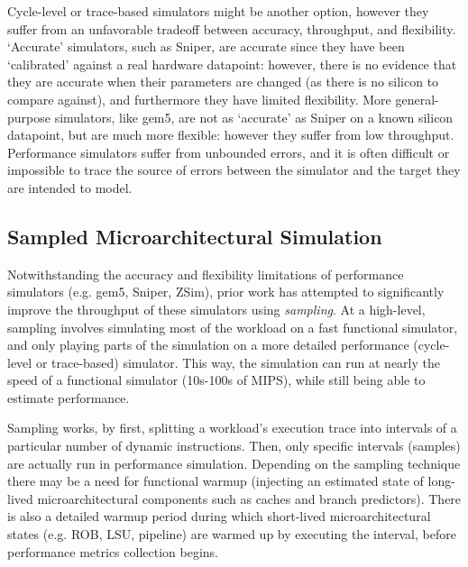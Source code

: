 \documentclass[sigplan,nonacm,10pt]{acmart}
\begin{document}
Cycle-level or trace-based simulators might be another option, however they suffer from an unfavorable tradeoff between accuracy, throughput, and flexibility\cite{arch_sim_considered_harmful, the_whole_truth}.
`Accurate' simulators, such as Sniper, are accurate since they have been `calibrated' against a real hardware datapoint: however, there is no evidence that they are accurate when their parameters are changed (as there is no silicon to compare against), and furthermore they have limited flexibility\cite{arch_sim_survey, x86_arch_sim_study}.
More general-purpose simulators, like gem5, are not as `accurate' as Sniper on a known silicon datapoint, but are much more flexible: however they suffer from low throughput.
Performance simulators suffer from unbounded errors, and it is often difficult or impossible to trace the source of errors between the simulator and the target they are intended to model\cite{diagsim}.

\subsection{Sampled Microarchitectural Simulation}

Notwithstanding the accuracy and flexibility limitations of performance simulators (e.g. gem5, Sniper, ZSim), prior work has attempted to significantly improve the throughput of these simulators using \textit{sampling}.
At a high-level, sampling involves simulating most of the workload on a fast functional simulator, and only playing parts of the simulation on a more detailed performance (cycle-level or trace-based) simulator.
This way, the simulation can run at nearly the speed of a functional simulator (10s-100s of MIPS), while still being able to estimate performance.

Sampling works, by first, splitting a workload's execution trace into intervals of a particular number of dynamic instructions.
Then, only specific intervals (samples) are actually run in performance simulation.
Depending on the sampling technique there may be a need for functional warmup (injecting an estimated state of long-lived microarchitectural components such as caches and branch predictors).
There is also a detailed warmup period during which short-lived microarchitectural states (e.g. ROB, LSU, pipeline) are warmed up by executing the interval, before performance metrics collection begins.
\end{document}
